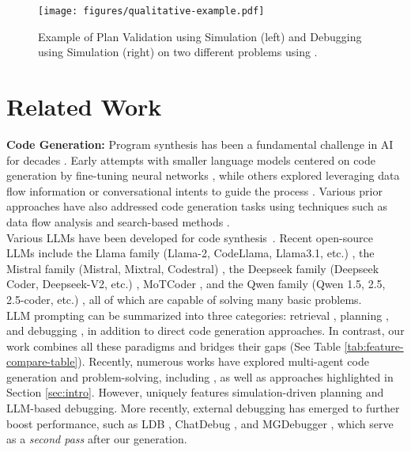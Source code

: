 \begin{figure*}[h]
    \centering
    \texttt{[image: figures/qualitative-example.pdf]}
    \caption{Example of Plan Validation using Simulation (left) and Debugging using Simulation (right) on two different problems using \toolnospace.}
    \label{fig:qualitative-example}
\end{figure*}  

\section{Related Work}
\label{sec:related-works}
\textbf{Code Generation:}
Program synthesis has been a fundamental challenge in AI for decades \cite{Zohar71}. Early attempts with smaller language models centered on code generation by fine-tuning neural networks \cite{wang2021codet5, ahmad2021unified, feng2020codebert, parvez-etal-2018-building, deep_net_for_source_code, code_gen_parsing, cmu_code_gen, naturalnessofsoft}, while others explored leveraging data flow information or conversational intents to guide the process \cite{andreas-etal-2020-task, yu-etal-2019-cosql}. Various prior approaches have also addressed code generation tasks using techniques such as data flow analysis and search-based methods \cite{li2022competition, parisotto2017neural, polozov2015flashmeta, gulwani2011automating}.
\smallskip \\
Various LLMs have been developed for code synthesis~\citep{austin2021program, chen2021evaluating, nijkamp2022codegen, fried2022incoder, allal2023santacoder, alphacode}. Recent open-source LLMs include the Llama family (Llama-2, CodeLlama, Llama3.1, etc.) \citep{roziere2023code, touvron2023llama}, the Mistral family (Mistral, Mixtral, Codestral) \citep{jiang2023mistral}, the Deepseek family (Deepseek Coder, Deepseek-V2, etc.) \cite{guo2024deepseek}, MoTCoder \cite{li2023motcoder}, and the Qwen family (Qwen 1.5, 2.5, 2.5-coder, etc.) \cite{hui2024qwen2}, all of which are capable of solving many basic problems.
\smallskip \\
LLM prompting can be summarized into three categories: retrieval \cite{yasunaga2023large, parvez2021retrieval, parvez-etal-2023-retrieval}, planning \citep{jiang2023self, wei2022chain}, and debugging \citep{le2022coderl, chen2022codet, chen2023teaching, ridnik2024code}, in addition to direct code generation approaches. In contrast, our work combines all these paradigms and bridges their gaps (See Table \ref{tab:feature-compare-table}). Recently, numerous works have explored multi-agent code generation and problem-solving, including \cite{kulesza2004generative, jin2024mare, phan2024hyperagent}, as well as approaches highlighted in Section \ref{sec:intro}. However, \tool uniquely features simulation-driven planning and LLM-based debugging. More recently, external debugging has emerged to further boost performance, such as LDB \cite{zhong-etal-2024-debug}, ChatDebug \cite{levin2024chatdbg}, and MGDebugger \cite{shi2024code-mgdebug}, which serve as a \emph{second pass} after our generation.




